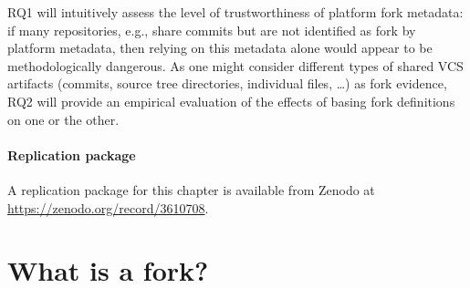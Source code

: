 
\vspace{1em}

\noindent{}

\vspace{1em}

\noindent{}

\vspace{1em}

RQ1 will intuitively assess the level of trustworthiness of platform fork
metadata: if many repositories, e.g., share commits but are not identified as
fork by platform metadata, then relying on this metadata alone would appear to
be methodologically dangerous. As one might consider different types of shared
VCS artifacts (commits, source tree directories, individual files, \ldots) as
fork evidence, RQ2 will provide an empirical evaluation of the effects of
basing fork definitions on one or the other.


\paragraph{Replication package}
A replication package for this chapter is available from Zenodo at
\url{https://zenodo.org/record/3610708}.


\section{What is a fork?}%
\label{sec:forks-defs}

